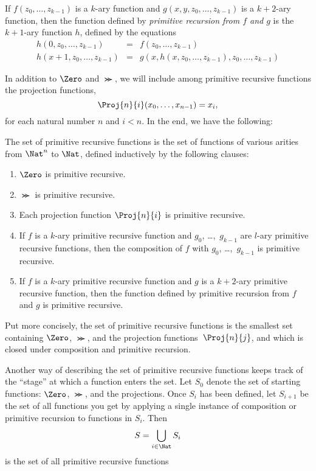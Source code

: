 \documentclass[../../../include/open-logic-section]{subfiles}
\begin{document}
\begin{defn}
If $f(z_0,\dots,z_{k-1})$ is a $k$-ary function and
$g(x,y,z_0,\dots,z_{k-1})$ is a $k+2$-ary function, then the function
defined by \emph{primitive recursion from $f$ and $g$} is the
$k+1$-ary function $h$, defined by the equations
\begin{eqnarray*}
h(0,z_0,\dots,z_{k-1}) & = & f(z_0,\dots,z_{k-1}) \\
h(x+1,z_0,\dots,z_{k-1}) & = & g(x,h(x,z_0,\dots,z_{k-1}),z_0,\dots,z_{k-1})
\end{eqnarray*}
\end{defn}

In addition to $\Zero$ and $\Succ$, we will include among primitive
recursive functions the projection functions,
\[
\Proj{n}{i}(x_0,\dots,x_{n-1}) = x_i,
\]
for each natural number $n$ and $i < n$. In the end, we have the
following:

\begin{defn}
  The set of primitive recursive functions is the set of functions of
  various arities from $\Nat^n$ to $\Nat$, defined inductively by the
  following clauses:
\begin{enumerate}
\item $\Zero$ is primitive recursive.
\item $\Succ$ is primitive recursive.
\item Each projection function $\Proj{n}{i}$ is primitive recursive.
\item If $f$ is a $k$-ary primitive recursive function and
  $g_0$, \dots,~$g_{k-1}$ are $l$-ary primitive recursive functions, then
  the composition of $f$ with $g_0$, \dots,~$g_{k-1}$ is primitive
  recursive.
\item If $f$ is a $k$-ary primitive recursive function and $g$ is a
  $k+2$-ary primitive recursive function, then the function defined by
  primitive recursion from $f$ and $g$ is primitive recursive.
\end{enumerate}
\end{defn}

\begin{explain}
Put more concisely, the set of primitive recursive functions is the
smallest set containing $\Zero$, $\Succ$, and the projection
functions~$\Proj{n}{j}$, and which is closed under composition and
primitive recursion.

Another way of describing the set of primitive recursive functions
keeps track of the ``stage'' at which a function enters the set. Let
$S_0$ denote the set of starting functions: $\Zero$, $\Succ$, and the
projections. Once $S_i$ has been defined, let $S_{i+1}$ be the set of
all functions you get by applying a single instance of composition or
primitive recursion to functions in $S_i$. Then
\[
S = \bigcup_{i \in \Nat} S_i
\]
is the set of all primitive recursive functions
\end{explain}
\end{document}
